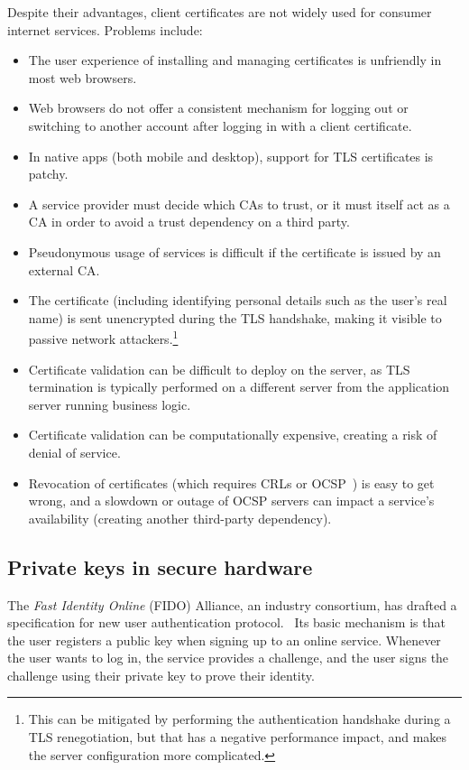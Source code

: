 Despite their advantages, client certificates are not widely used for consumer internet services.
Problems include:
\begin{itemize}
\item The user experience of installing and managing certificates is unfriendly in most web
browsers.
\item Web browsers do not offer a consistent mechanism for logging out or switching to another
account after logging in with a client certificate.
\item In native apps (both mobile and desktop), support for TLS certificates is patchy.
\item A service provider must decide which CAs to trust, or it must itself act as a CA in order to
avoid a trust dependency on a third party.
\item Pseudonymous usage of services is difficult if the certificate is issued by an external CA.
\item The certificate (including identifying personal details such as the user's real name) is sent
unencrypted during the TLS handshake, making it visible to passive network attackers.\footnote{This
can be mitigated by performing the authentication handshake during a TLS renegotiation, but that has
a negative performance impact, and makes the server configuration more complicated.}
\item Certificate validation can be difficult to deploy on the server, as TLS termination is
typically performed on a different server from the application server running business logic.
\item Certificate validation can be computationally expensive, creating a risk of denial of
service.~\cite{Parsovs14}
\item Revocation of certificates (which requires CRLs or OCSP~\cite{OCSP}) is easy to get wrong, and
a slowdown or outage of OCSP servers can impact a service's availability (creating another
third-party dependency).
\end{itemize}

\subsection{Private keys in secure hardware}

The \emph{Fast Identity Online} (FIDO) Alliance, an industry consortium, has drafted a specification
for new user authentication protocol.~\cite{FIDOOverview, FIDOSpec} Its basic mechanism is that the
user registers a public key when signing up to an online service. Whenever the user wants to log in,
the service provides a challenge, and the user signs the challenge using their private key to prove
their identity.

